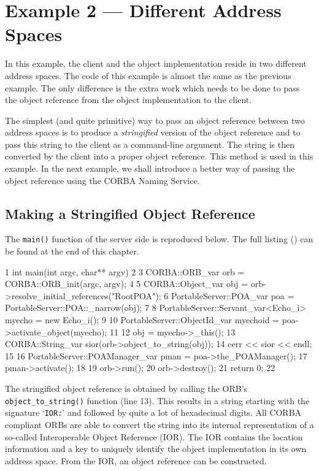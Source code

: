 \documentclass[11pt,oneside,a4paper]{book}
\newcommand{\code}[1]{\texttt{#1}}
\newcommand{\op}[1]{\texttt{#1()}}
\newcommand{\term}[1]{\textit{#1}}
\newcommand{\dsc}{\discretionary{}{}{}}
\begin{document}
\section{Example 2 --- Different Address Spaces}

In this example, the client and the object implementation reside in
two different address spaces. The code of this example is almost the
same as the previous example. The only difference is the extra work
which needs to be done to pass the object reference from the object
implementation to the client.

The simplest (and quite primitive) way to pass an object reference
between two address spaces is to produce a \term{stringified} version
of the object reference and to pass this string to the client as a
command-line argument.  The string is then converted by the client
into a proper object reference.  This method is used in this
example. In the next example, we shall introduce a better way of
passing the object reference using the CORBA Naming Service.

\subsection{Making a Stringified Object Reference}

The \op{main} function of the server side is reproduced below. The
full listing () can be found at the end of this
chapter.

\lstset{numbers=left,gobble=4}
\begin{cxxlisting}
 1  int main(int argc, char** argv)
 2  {
 3    CORBA::ORB_var orb = CORBA::ORB_init(argc, argv);
 4
 5    CORBA::Object_var       obj = orb->resolve_initial_references("RootPOA");
 6    PortableServer::POA_var poa = PortableServer::POA::_narrow(obj);
 7
 8    PortableServer::Servant_var<Echo_i> myecho = new Echo_i();
 9
10    PortableServer::ObjectId_var myechoid = poa->activate_object(myecho);
11
12    obj = myecho->_this();
13    CORBA::String_var sior(orb->object_to_string(obj));
14    cerr << sior << endl;
15
16    PortableServer::POAManager_var pman = poa->the_POAManager();
17    pman->activate();
18
19    orb->run();
20    orb->destroy();
21    return 0;
22  }
\end{cxxlisting}
\lstset{numbers=none,gobble=0}

The stringified object reference is obtained by calling the ORB's
\op{object\_to\_\dsc{}string} function (line 13). This results in a
string starting with the signature `\code{IOR:}' and followed by quite
a lot of hexadecimal digits. All CORBA compliant ORBs are able to
convert the string into its internal representation of a so-called
Interoperable Object Reference (IOR). The IOR contains the location
information and a key to uniquely identify the object implementation
in its own address space. From the IOR, an object reference can be
constructed.
\end{document}
